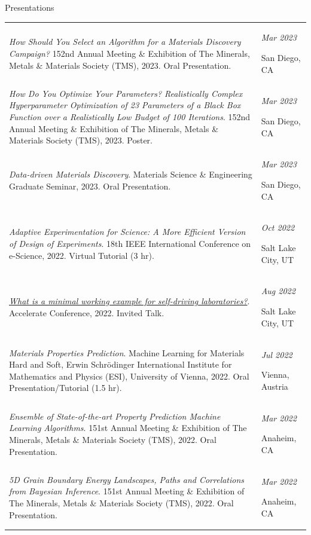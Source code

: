 \documentclass{resume} %
\begin{document}
\begin{rSection}{Presentations}
\begin{longtable}{m{13cm} m{3.5cm}}
{\textit{How Should You Select an Algorithm for a Materials Discovery Campaign?} 152nd Annual Meeting \& Exhibition of The Minerals, Metals \& Materials Society (TMS), 2023. Oral Presentation.} & {\em \hfill Mar 2023 \par \hfill San Diego, CA} \\
{\textit{How Do You Optimize Your Parameters? Realistically Complex Hyperparameter Optimization of 23 Parameters of a Black Box Function over a Realistically Low Budget of 100 Iterations}. 152nd Annual Meeting \& Exhibition of The Minerals, Metals \& Materials Society (TMS), 2023. Poster.} & {\em \hfill Mar 2023 \par \hfill San Diego, CA} \\
{\textit{Data-driven Materials Discovery}. Materials Science \& Engineering Graduate Seminar, 2023. Oral Presentation.} & {\em \hfill Mar 2023 \par \hfill San Diego, CA} \\
{\textit{Adaptive Experimentation for Science: A More Efficient Version of Design of Experiments}. 18th IEEE International Conference on e-Science, 2022. Virtual Tutorial (3 hr).} & {\em \hfill Oct 2022 \par \hfill Salt Lake City, UT} \\
{\textit{\href{https://youtu.be/LNkRjByzeZg?si=04bLIokgA4k_HTFB&t=33}{What is a minimal working example for self-driving laboratories?}}. Accelerate Conference, 2022. Invited Talk.} & {\em \hfill Aug 2022 \par \hfill Salt Lake City, UT} \\
{\textit{Materials Properties Prediction}. Machine Learning for Materials Hard and Soft, Erwin Schrödinger International Institute for Mathematics and Physics (ESI), University of Vienna, 2022. Oral Presentation/Tutorial (1.5 hr).} & {\em \hfill Jul 2022 \par \hfill Vienna, Austria} \\
{\textit{Ensemble of State-of-the-art Property Prediction Machine Learning Algorithms}. 151st Annual Meeting \& Exhibition of The Minerals, Metals \& Materials Society (TMS), 2022. Oral Presentation.} & {\em \hfill Mar 2022 \par \hfill Anaheim, CA} \\
{\textit{5D Grain Boundary Energy Landscapes, Paths and Correlations from Bayesian Inference}. 151st Annual Meeting \& Exhibition of The Minerals, Metals \& Materials Society (TMS), 2022. Oral Presentation.} & {\em \hfill Mar 2022 \par \hfill Anaheim, CA} \\

\end{longtable}
\end{rSection}
\end{document}
